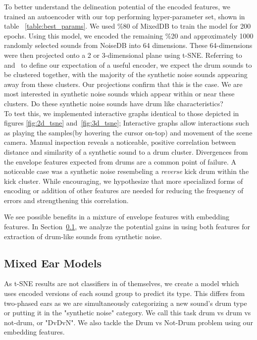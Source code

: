 \documentclass[\main/thesis.tex]{subfiles}
\begin{document}
To better understand the delineation potential of the encoded features,  we trained an autoencoder with our top performing hyper-parameter set, shown in table ~\ref{table:best_params}. We used \%80 of MixedDB to train the model for 200 epochs. Using this model, we encoded the remaining \%20 and approximately 1000 randomly selected sounds from NoiseDB into 64 dimensions. These 64-dimensions were then projected onto a 2 or 3-dimensional plane using t-SNE. Referring to~ and~ to define our expectation of a useful encoder, we expect the drum sounds to be clustered together, with the majority of the synthetic noise sounds appearing away from these clusters. Our projections confirm that this is the case. We are most interested in synthetic noise sounds which appear within or near these clusters. Do these synthetic noise sounds have drum like characteristics?\\ 


To test this, we implemented interactive graphs identical to those depicted in figures \ref{fig:2d_tsne} and~\ref{fig:3d_tsne}; Interactive graphs allow interactions such as playing the samples(by hovering the cursor on-top) and movement of the scene camera.  Manual inspection reveals a noticeable, positive correlation between distance and similarity of a synthetic sound to a drum cluster. Divergences from the envelope features expected from drums are a common point of failure. A noticeable case was a synthetic noise resembeling a \emph{reverse} kick drum within the kick cluster. While encouraging, we hypothesize that more specialized forms of encoding or addition of other features are needed for reducing the frequency of errors and strengthening this correlation.

We see possible benefits in a mixture of envelope features with embedding features. In Section~\ref{chap3:mixed_ear_models}, we analyze the potential gains in using both features for extraction of drum-like sounds from synthetic noise. 

\subsection{Mixed Ear Models}
\label{chap3:mixed_ear_models}
As t-SNE results are not classifiers in of themselves, we create a model which uses encoded versions of each sound group to predict its type. This differs from two-phased ears as we are simultaneously categorizing a new sound's drum type or putting it in the "synthetic noise" category. We call this task drum vs drum vs not-drum, or "DvDvN". We also tackle the Drum vs Not-Drum problem using our embedding features.
\end{document}
